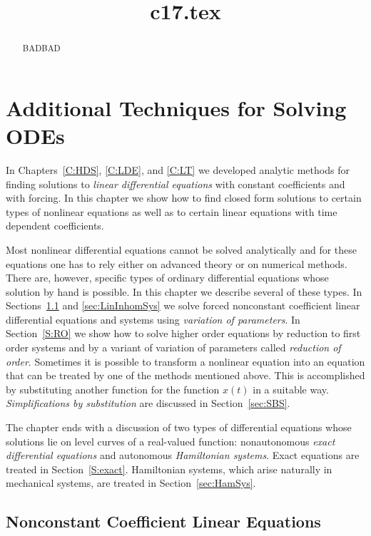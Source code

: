 \documentclass{ximera}
\title{c17.tex}
\begin{document}
\begin{abstract}
BADBAD
\end{abstract}
\maketitle

\chapter{Additional Techniques for Solving ODEs}
\label{chap:SingleOdes}

In Chapters~\ref{C:HDS}, \ref{C:LDE}, and \ref{C:LT} we developed analytic 
methods for finding solutions to {\em linear differential equations\/} with 
constant coefficients and with forcing.  In this chapter we show how to find 
closed form solutions to certain types of nonlinear equations as well as to 
certain linear equations with time dependent coefficients.

Most nonlinear differential equations cannot be solved analytically and   
for these equations one has to rely either on advanced theory or on 
numerical methods.  There are, however, specific types of ordinary differential 
equations whose solution by hand is possible.  In this chapter we describe 
several of these types.  In Sections~\ref{sec:VarConstS} and 
\ref{sec:LinInhomSys} we solve forced nonconstant coefficient linear 
differential equations and systems using {\em variation of parameters}.  In 
Section~\ref{S:RO} we show how to solve higher order equations by reduction 
to first order systems and by a variant of variation of parameters called 
{\em reduction of order\/}.  
Sometimes it is possible to transform a nonlinear equation into an equation 
that can be treated by one of the methods mentioned above.  This is 
accomplished by substituting another function for the function $x(t)$ in a suitable way.  {\em Simplifications by substitution\/} are discussed in 
Section~\ref{sec:SBS}.  

The chapter ends with a discussion of two types of 
differential equations whose solutions lie on level curves of a real-valued 
function: nonautonomous {\em exact differential equations\/} and autonomous 
{\em Hamiltonian systems}.  Exact equations are treated in 
Section~\ref{S:exact}.   Hamiltonian systems, which arise naturally in 
mechanical systems, are treated in Section~\ref{sec:HamSys}.  


\section{Nonconstant Coefficient Linear Equations}
\label{sec:VarConstS}
\end{document}
